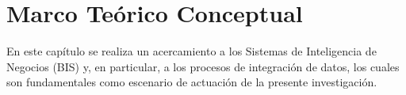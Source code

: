 \chapter{Marco Te\'orico Conceptual}\label{chapter:teoricframe}

En este capítulo se realiza un acercamiento a los Sistemas de Inteligencia de Negocios (BIS) y, en particular, 
a los procesos de integración de datos, los cuales son fundamentales como escenario de actuación de la presente 
investigación.



